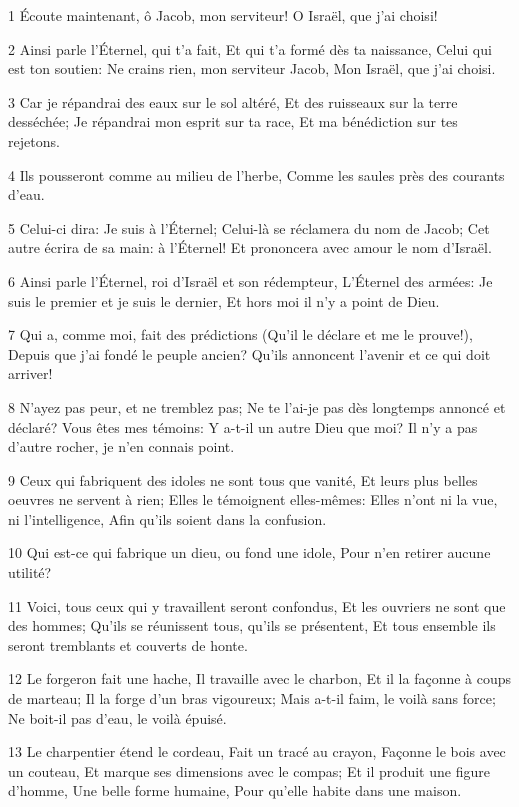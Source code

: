 \par 1 Écoute maintenant, ô Jacob, mon serviteur! O Israël, que j'ai choisi!
\par 2 Ainsi parle l'Éternel, qui t'a fait, Et qui t'a formé dès ta naissance, Celui qui est ton soutien: Ne crains rien, mon serviteur Jacob, Mon Israël, que j'ai choisi.
\par 3 Car je répandrai des eaux sur le sol altéré, Et des ruisseaux sur la terre desséchée; Je répandrai mon esprit sur ta race, Et ma bénédiction sur tes rejetons.
\par 4 Ils pousseront comme au milieu de l'herbe, Comme les saules près des courants d'eau.
\par 5 Celui-ci dira: Je suis à l'Éternel; Celui-là se réclamera du nom de Jacob; Cet autre écrira de sa main: à l'Éternel! Et prononcera avec amour le nom d'Israël.
\par 6 Ainsi parle l'Éternel, roi d'Israël et son rédempteur, L'Éternel des armées: Je suis le premier et je suis le dernier, Et hors moi il n'y a point de Dieu.
\par 7 Qui a, comme moi, fait des prédictions (Qu'il le déclare et me le prouve!), Depuis que j'ai fondé le peuple ancien? Qu'ils annoncent l'avenir et ce qui doit arriver!
\par 8 N'ayez pas peur, et ne tremblez pas; Ne te l'ai-je pas dès longtemps annoncé et déclaré? Vous êtes mes témoins: Y a-t-il un autre Dieu que moi? Il n'y a pas d'autre rocher, je n'en connais point.
\par 9 Ceux qui fabriquent des idoles ne sont tous que vanité, Et leurs plus belles oeuvres ne servent à rien; Elles le témoignent elles-mêmes: Elles n'ont ni la vue, ni l'intelligence, Afin qu'ils soient dans la confusion.
\par 10 Qui est-ce qui fabrique un dieu, ou fond une idole, Pour n'en retirer aucune utilité?
\par 11 Voici, tous ceux qui y travaillent seront confondus, Et les ouvriers ne sont que des hommes; Qu'ils se réunissent tous, qu'ils se présentent, Et tous ensemble ils seront tremblants et couverts de honte.
\par 12 Le forgeron fait une hache, Il travaille avec le charbon, Et il la façonne à coups de marteau; Il la forge d'un bras vigoureux; Mais a-t-il faim, le voilà sans force; Ne boit-il pas d'eau, le voilà épuisé.
\par 13 Le charpentier étend le cordeau, Fait un tracé au crayon, Façonne le bois avec un couteau, Et marque ses dimensions avec le compas; Et il produit une figure d'homme, Une belle forme humaine, Pour qu'elle habite dans une maison.

